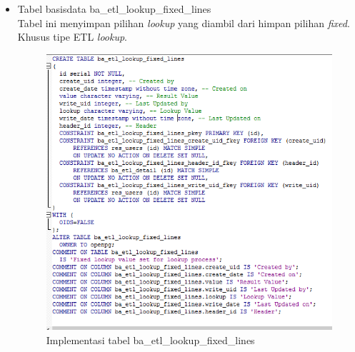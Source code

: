 \begin{itemize}
		\item Tabel basisdata ba\_etl\_lookup\_fixed\_lines\\
		Tabel ini menyimpan pilihan \textit{lookup} yang diambil dari himpan pilihan \textit{fixed}. Khusus tipe ETL \textit{lookup}.
		\begin{figure}[H]
		\centering
		\includegraphics[scale=0.5]{Gambar/tabel-ba-etl-lookup-fixed-lines}
		\caption{Implementasi tabel ba\_etl\_lookup\_fixed\_lines}
		\end{figure}
		

\end{itemize}
